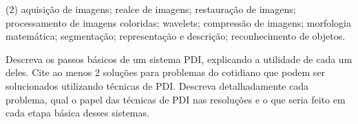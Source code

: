 \documentclass[12pt,a4paper]{article}
\begin{document}
\begin{solution}
    \begin{tasks}(2)
        \task aquisição de imagens;
        \task realce de imagens;
        \task restauração de imagens;
        \task processamento de imagens coloridas;
        \task wavelets;
        \task compressão de imagens;
        \task morfologia matemática;
        \task segmentação;
        \task representação e descrição;
        \task reconhecimento de objetos.
    \end{tasks}
\end{solution}



\begin{question}{0.34}
Descreva os passos básicos de um sistema PDI, explicando a utilidade de cada um
deles. Cite ao menos 2 soluções para problemas do cotidiano que podem ser
solucionados utilizando técnicas de PDI. Descreva detalhadamente cada problema,
qual o papel das técnicas de PDI nas resoluções e o que seria feito em cada
etapa básica desses sistemas.
\end{question}


\pagebreak
\medskip
\printbibliography[
    heading=bibintoc,
    title={Referências Bibliográficas}
]
\end{document}
